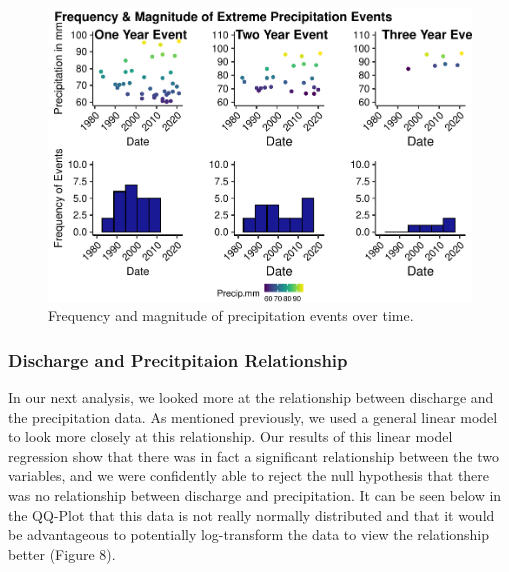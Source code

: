 \documentclass[
]{article}
\begin{document}
\begin{figure}
\centering
\includegraphics{SD_AD_NVT_EDAfinal_files/figure-latex/unnamed-chunk-14-1.pdf}
\caption{Frequency and magnitude of precipitation events over time.}
\end{figure}

\newpage

\hypertarget{discharge-and-precitpitaion-relationship}{%
\subsubsection{\texorpdfstring{\textbf{Discharge and Precitpitaion
Relationship}}{Discharge and Precitpitaion Relationship}}\label{discharge-and-precitpitaion-relationship}}

In our next analysis, we looked more at the relationship between
discharge and the precipitation data. As mentioned previously, we used a
general linear model to look more closely at this relationship. Our
results of this linear model regression show that there was in fact a
significant relationship between the two variables, and we were
confidently able to reject the null hypothesis that there was no
relationship between discharge and precipitation. It can be seen below
in the QQ-Plot that this data is not really normally distributed and
that it would be advantageous to potentially log-transform the data to
view the relationship better (Figure 8).
\end{document}
